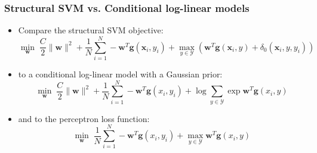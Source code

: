 \documentclass[ignorenonframetext,plain,fleqn]{beamer}
\renewcommand{\vec}{\mathbf}
\begin{document}
\begin{frame}\frametitle{Structural SVM vs. Conditional log-linear models}
\begin{itemize}
\item Compare the structural SVM objective: \[
\min_\vec{w}\; 
 \frac{C}{2} \|\vec{w}\|^2
+ \frac{1}{N} \sum_{i=1}^N 
-  \vec{w}^T\vec{g}(\vec{x}_i,y_i) + \max_{y\in\mathcal{Y}}
(  \vec{w}^T\vec{g}(\vec{x}_i,y) + \delta_0(\vec{x}_i,y,y_i))
\]
\item to a conditional log-linear model with a Gaussian prior: \[
\min_\vec{w}\;
 \frac{C}{2} \|\vec{w}\|^2
+ \frac{1}{N} \sum_{i=1}^N 
-\vec{w}^T \vec{g}(x_i,y_i) 
+\log \sum_{y\in\mathcal{Y}} \exp \vec{w}^T \vec{g}(x_i,y) 
\]
\item and to the perceptron loss function: \[
\min_\vec{w}\;
\frac{1}{N} \sum_{i=1}^N 
-\vec{w}^T \vec{g}(x_i,y_i)
+\max_{y\in\mathcal{Y}} \vec{w}^T \vec{g}(x_i,y)
\]
\end{itemize}
\end{frame}
\end{document}
